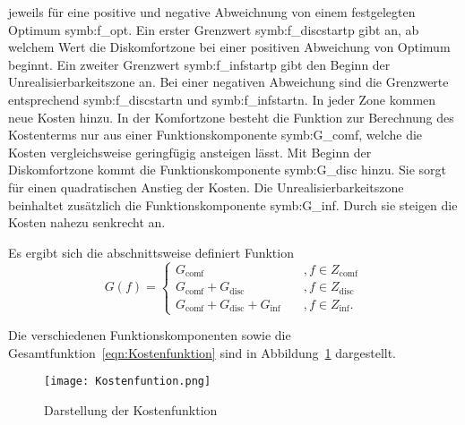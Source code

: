 jeweils f\"ur eine positive und negative Abweichnung von einem festgelegten Optimum \gls{symb:f_opt}.
Ein erster Grenzwert \gls{symb:f_discstartp} gibt an, ab welchem Wert die Diskomfortzone bei einer positiven Abweichung von Optimum beginnt. 
Ein zweiter Grenzwert \gls{symb:f_infstartp} gibt den Beginn der Unrealisierbarkeitszone an.
Bei einer negativen Abweichung sind die Grenzwerte entsprechend \gls{symb:f_discstartn} und \gls{symb:f_infstartn}.
In jeder Zone kommen neue Kosten hinzu.
In der Komfortzone besteht die Funktion zur Berechnung des Kostenterms nur aus einer Funktionskomponente \gls{symb:G_comf}, welche die Kosten vergleichsweise geringf\"ugig ansteigen l\"asst.
Mit Beginn der Diskomfortzone kommt die Funktionskomponente \gls{symb:G_disc} hinzu. 
Sie sorgt f\"ur einen quadratischen Anstieg der Kosten.
Die Unrealisierbarkeitszone beinhaltet zus\"atzlich die Funktionskomponente \gls{symb:G_inf}.
Durch sie steigen die Kosten nahezu senkrecht an.

Es ergibt sich die abschnittsweise definiert Funktion
\begin{equation}
  G(f) = 
  \begin{cases} 
    G_\mathrm{comf}                         & \quad , f \in Z_\mathrm{comf}\\ 
    G_\mathrm{comf} + G_\mathrm{disc}              & \quad , f \in Z_\mathrm{disc}\\ 
    G_\mathrm{comf} + G_\mathrm{disc} + G_\mathrm{inf}    & \quad , f \in Z_\mathrm{inf}.
  \end{cases} 
  \label{eqn:Kostenfunktion}
\end{equation}

Die verschiedenen Funktionskomponenten sowie die Gesamtfunktion~\ref{eqn:Kostenfunktion} sind in Abbildung~\ref{fig:Kostenfuntion} dargestellt.

\begin{figure}[H]
    \centering
    \texttt{[image: Kostenfuntion.png]}
    \caption[Kostenfunktion]{Darstellung der Kostenfunktion}
    \label{fig:Kostenfuntion}
 \end{figure}


